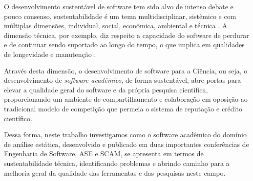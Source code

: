 

O desenvolvimento sustentável de software tem sido alvo de intenso debate e
pouco consenso, sustentabilidade é um tema multidisciplinar, sistêmico e com
múltiplas dimensões, individual, social, econômica, ambiental e técnica
\cite{becker2014karlskrona}. A dimensão técnica, por exemplo, diz respeito a
capacidade do software de perdurar e de continuar sendo suportado ao longo do
tempo, o que implica em qualidades de longevidade e manutenção
\cite{venters2014software}.

Através desta dimensão, o desenvolvimento de software para a Ciência, ou seja,
o desenvolvimento de {\it software acadêmico}, de forma sustentável, abre portas para elevar a qualidade
geral do software e da própria pesquisa científica, proporcionando um
ambiente de compartilhamento e colaboração em oposição ao tradicional modelo de
competição que permeia o sistema de reputação e crédito científico.


Dessa forma, neste trabalho investigamos como o software acadêmico do domínio
de análise estática, desenvolvido e publicado em duas importantes conferências
de Engenharia de Software, ASE e SCAM, se apresenta em termos de
sustentabilidade técnica, identificando problemas e abrindo caminho para a
melhoria geral da qualidade das ferramentas e das pesquisas neste campo.




